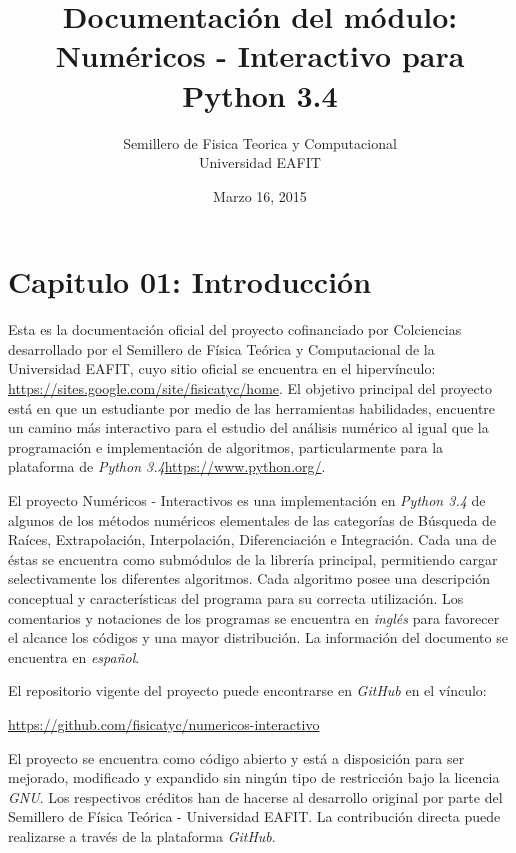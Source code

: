 \documentclass[letterpaper,10pt,oneside]{sphinxmanual}
\title{Documentación del módulo: \\ Numéricos - Interactivo para Python 3.4}
\date{Marzo 16, 2015}
\author{Semillero de Fisica Teorica y Computacional \\ Universidad EAFIT}
\theoremstyle{plain}%
\theoremstyle{definition}%
\theoremstyle{remark}%
\begin{document}
\maketitle
\tableofcontents
{}\label{Índice::doc}

\chapter{Capitulo 01: Introducción}
\label{chapter01::doc}\label{chapter01:capitulo-01-Introducción}


\noindent Esta es la documentación oficial del proyecto cofinanciado por Colciencias desarrollado por el Semillero de Física Teórica y Computacional de la Universidad EAFIT, cuyo sitio oficial se encuentra en el hipervínculo: \href{https://sites.google.com/site/fisicatyc/home}{https://sites.google.com/site/fisicatyc/home}. El objetivo principal del proyecto está en que un estudiante por medio de las herramientas habilidades, encuentre un camino más interactivo para el estudio del análisis numérico al igual que la programación e implementación de algoritmos, particularmente para la plataforma de \textit{Python 3.4}\href{https://www.python.org/}{https://www.python.org/}.

El proyecto Numéricos - Interactivos es una implementación en \textit{Python 3.4} de algunos de los métodos numéricos
elementales de las categorías de Búsqueda de Raíces, Extrapolación, Interpolación, Diferenciación e Integración. Cada una de éstas se encuentra como submódulos de la librería principal, permitiendo cargar selectivamente los diferentes algoritmos. Cada algoritmo posee una descripción conceptual y características del programa para su correcta utilización. Los comentarios y notaciones de los programas se encuentra en \textit{inglés} para favorecer el alcance los códigos y una mayor distribución. La información del documento se encuentra en \textit{español}.

El repositorio vigente del proyecto puede encontrarse en \textit{GitHub} en el vínculo:

\href{https://github.com/fisicatyc/numericos-interactivo}{https://github.com/fisicatyc/numericos-interactivo}

El proyecto se encuentra como código abierto y está a disposición para ser mejorado, modificado y expandido sin ningún tipo de restricción bajo la licencia \textit{GNU}. Los respectivos créditos han de hacerse al desarrollo original por parte del Semillero de Física Teórica - Universidad EAFIT. La contribución directa puede realizarse a través de la plataforma \textit{GitHub}.
\end{document}
